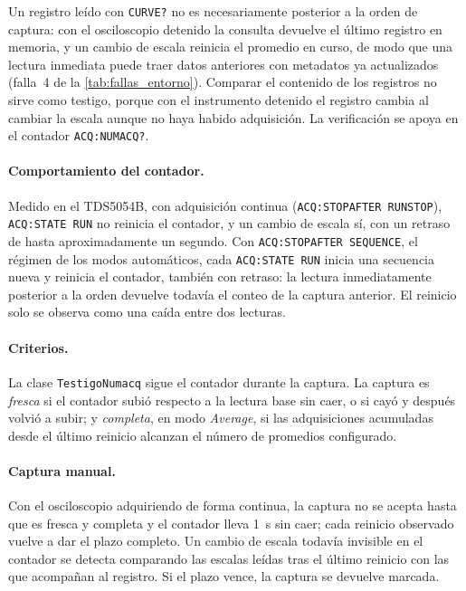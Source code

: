Un registro leído con \texttt{CURVE?} no es necesariamente posterior a
la orden de captura: con el osciloscopio detenido la consulta devuelve
el último registro en memoria, y un cambio de escala reinicia el
promedio en curso, de modo que una lectura inmediata puede traer datos
anteriores con metadatos ya actualizados (falla~4 de la
\cref{tab:fallas_entorno}). Comparar el contenido de los registros no
sirve como testigo, porque con el instrumento detenido el registro
cambia al cambiar la escala aunque no haya habido adquisición. La
verificación se apoya en el contador \texttt{ACQ:NUMACQ?}.

\paragraph{Comportamiento del contador.} Medido en el TDS5054B, con
adquisición continua (\texttt{ACQ:STOPAFTER RUNSTOP}),
\texttt{ACQ:STATE RUN} no reinicia el contador, y un cambio de escala sí,
con un retraso de hasta aproximadamente un segundo. Con
\texttt{ACQ:STOPAFTER SEQUENCE}, el régimen de los modos automáticos,
cada \texttt{ACQ:STATE RUN} inicia una secuencia nueva y reinicia el
contador, también con retraso: la lectura inmediatamente posterior a la
orden devuelve todavía el conteo de la captura anterior. El reinicio
solo se observa como una caída entre dos lecturas.

\paragraph{Criterios.} La clase \texttt{TestigoNumacq} sigue el
contador durante la captura. La captura es \emph{fresca} si el contador
subió respecto a la lectura base sin caer, o si cayó y después volvió a
subir; y \emph{completa}, en modo \textit{Average}, si las adquisiciones
acumuladas desde el último reinicio alcanzan el número de promedios
configurado.

\paragraph{Captura manual.} Con el osciloscopio adquiriendo de forma
continua, la captura no se acepta hasta que es fresca y completa y el
contador lleva \SI{1}{\second} sin caer; cada reinicio observado vuelve a
dar el plazo completo. Un cambio de escala todavía invisible en el
contador se detecta comparando las escalas leídas tras el último
reinicio con las que acompañan al registro. Si el plazo vence, la
captura se devuelve marcada.


